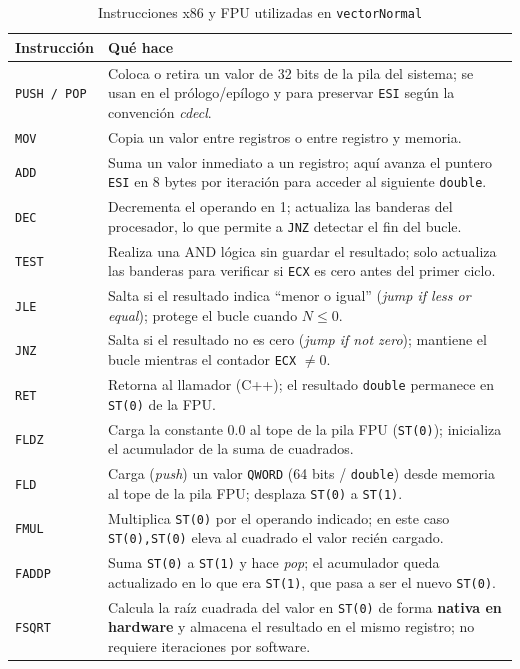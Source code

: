 \documentclass[12pt, letterpaper]{article}
\begin{document}
\begin{table}[H]
    \centering
    \begin{tabular}{@{}lp{9.5cm}@{}}
        \toprule
        \textbf{Instrucción} & \textbf{Qué hace} \\
        \midrule
        \texttt{PUSH / POP} & Coloca o retira un valor de 32 bits de la pila del sistema; se usan en el prólogo/epílogo y para preservar \texttt{ESI} según la convención \textit{cdecl}. \\
        \texttt{MOV}    & Copia un valor entre registros o entre registro y memoria. \\
        \texttt{ADD}    & Suma un valor inmediato a un registro; aquí avanza el puntero \texttt{ESI} en 8 bytes por iteración para acceder al siguiente \texttt{double}. \\
        \texttt{DEC}    & Decrementa el operando en 1; actualiza las banderas del procesador, lo que permite a \texttt{JNZ} detectar el fin del bucle. \\
        \texttt{TEST}   & Realiza una AND lógica sin guardar el resultado; solo actualiza las banderas para verificar si \texttt{ECX} es cero antes del primer ciclo. \\
        \texttt{JLE}    & Salta si el resultado indica ``menor o igual'' (\textit{jump if less or equal}); protege el bucle cuando $N \leq 0$. \\
        \texttt{JNZ}    & Salta si el resultado no es cero (\textit{jump if not zero}); mantiene el bucle mientras el contador \texttt{ECX} $\neq 0$. \\
        \texttt{RET}    & Retorna al llamador (C++); el resultado \texttt{double} permanece en \texttt{ST(0)} de la FPU. \\
        \texttt{FLDZ}   & Carga la constante 0.0 al tope de la pila FPU (\texttt{ST(0)}); inicializa el acumulador de la suma de cuadrados. \\
        \texttt{FLD}    & Carga (\textit{push}) un valor \texttt{QWORD} (64 bits / \texttt{double}) desde memoria al tope de la pila FPU; desplaza \texttt{ST(0)} a \texttt{ST(1)}. \\
        \texttt{FMUL}   & Multiplica \texttt{ST(0)} por el operando indicado; en este caso \texttt{ST(0),ST(0)} eleva al cuadrado el valor recién cargado. \\
        \texttt{FADDP}  & Suma \texttt{ST(0)} a \texttt{ST(1)} y hace \textit{pop}; el acumulador queda actualizado en lo que era \texttt{ST(1)}, que pasa a ser el nuevo \texttt{ST(0)}. \\
        \texttt{FSQRT}  & Calcula la raíz cuadrada del valor en \texttt{ST(0)} de forma \textbf{nativa en hardware} y almacena el resultado en el mismo registro; no requiere iteraciones por software. \\
        \bottomrule
    \end{tabular}
    \caption{Instrucciones x86 y FPU utilizadas en \texttt{vectorNormal}}
\end{table}
\end{document}

